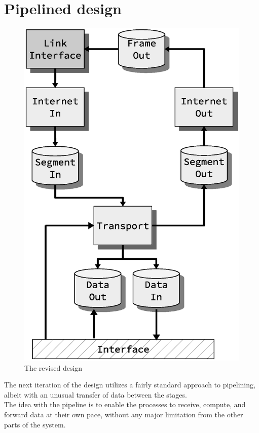 \section{Pipelined design}
\begin{figure}
    \includegraphics[scale=0.45]{design/design_1.eps}
    \caption{The revised design}
    \label{fig:revised_design}
\end{figure}

The next iteration of the design utilizes a fairly standard approach to 
pipelining, albeit with an unusual transfer of data between the stages.\\
The idea with the pipeline is to enable the processes to receive, compute, and 
forward data at their own pace, without any major limitation from the other 
parts of the system.


